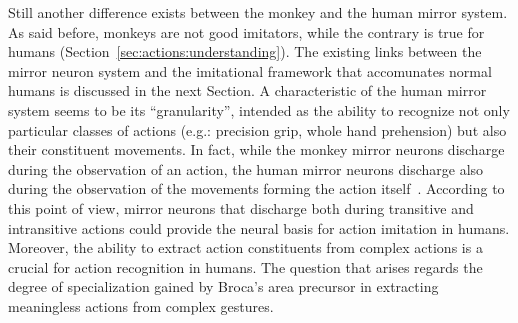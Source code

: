 Still another difference exists between the monkey and the human mirror
system. 
As said before, monkeys are not good imitators, while the contrary is true for
humans (Section~\ref{sec:actions:understanding}). 
The existing links between the mirror neuron system and the imitational
framework that accomunates normal humans is discussed in the next Section.
A characteristic of the human mirror system seems to be its ``granularity'',
intended as the ability to recognize not only particular classes of actions
(e.g.: precision grip, whole hand prehension) but also their constituent
movements.
In fact, while the monkey mirror neurons discharge during the observation of
an action, the human mirror neurons discharge also during the observation of
the movements forming the action itself~\citep{rizzolatti.craighero:2004}.
According to this point of view, mirror neurons that discharge both during
transitive and intransitive actions could provide the neural basis for action
imitation in humans.
Moreover, the ability to extract action constituents from complex actions is a
crucial for action recognition in humans.
The question that arises regards the degree of specialization gained by Broca's
area precursor in extracting meaningless actions from complex gestures.

